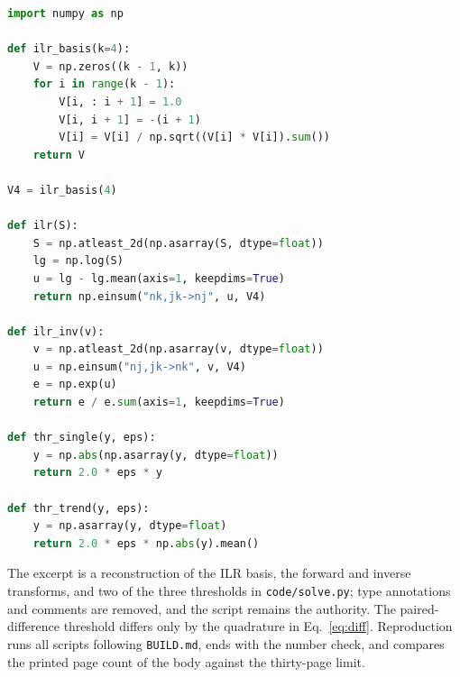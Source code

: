 \documentclass[withoutpreface,bwprint]{apmcmthesis}
\begin{document}
\begin{lstlisting}[language=Python]
import numpy as np

def ilr_basis(k=4):
    V = np.zeros((k - 1, k))
    for i in range(k - 1):
        V[i, : i + 1] = 1.0
        V[i, i + 1] = -(i + 1)
        V[i] = V[i] / np.sqrt((V[i] * V[i]).sum())
    return V

V4 = ilr_basis(4)

def ilr(S):
    S = np.atleast_2d(np.asarray(S, dtype=float))
    lg = np.log(S)
    u = lg - lg.mean(axis=1, keepdims=True)
    return np.einsum("nk,jk->nj", u, V4)

def ilr_inv(v):
    v = np.atleast_2d(np.asarray(v, dtype=float))
    u = np.einsum("nj,jk->nk", v, V4)
    e = np.exp(u)
    return e / e.sum(axis=1, keepdims=True)

def thr_single(y, eps):
    y = np.abs(np.asarray(y, dtype=float))
    return 2.0 * eps * y

def thr_trend(y, eps):
    y = np.asarray(y, dtype=float)
    return 2.0 * eps * np.abs(y).mean()
\end{lstlisting}

The excerpt is a reconstruction of the ILR basis, the forward and inverse transforms, and two of the three thresholds in \texttt{code/solve.py}; type annotations and comments are removed, and the script remains the authority. The paired-difference threshold differs only by the quadrature in Eq.~\eqref{eq:diff}. Reproduction runs all \CodeIndexCount{} scripts following \texttt{BUILD.md}, ends with the number check, and compares the printed page count of the body against the thirty-page limit.
\end{document}

